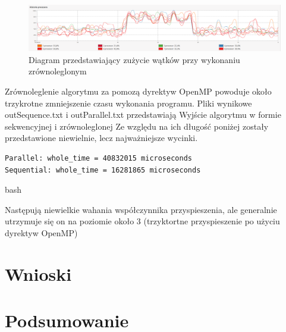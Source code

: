 \documentclass[10pt,a4paper]{article}
\begin{document}
\begin{figure}[H]
\includegraphics[scale=0.2]{zrzutParallel.png}
\centering
\caption{\label{diagramParallel}Diagram przedstawiający zużycie wątków przy wykonaniu zrównoleglonym}
\end{figure}


Zrównoleglenie algorytmu za pomozą dyrektyw OpenMP powoduje około trzykrotne zmniejszenie czasu wykonania programu. Pliki wynikowe outSequence.txt i outParallel.txt przedstawiają Wyjście algorytmu w formie sekwencyjnej i zrównoleglonej Ze względu na ich długość poniżej zostały przedstawione niewielnie, lecz najważniejsze wycinki.

\begin{verbatim}
Parallel: whole_time = 40832015 microseconds
Sequential: whole_time = 16281865 microseconds
\end{verbatim}{bash}

Następują niewielkie wahania współczynnika przyspieszenia, ale generalnie utrzymuje się on na poziomie około 3 (trzyktortne przyspieszenie po użyciu dyrektyw OpenMP)

\section{Wnioski}

\section{Podsumowanie}
\end{document}
